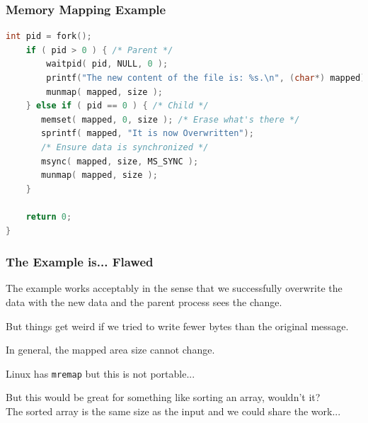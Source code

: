\begin{frame}[fragile]
\frametitle{Memory Mapping Example}

\begin{lstlisting}[language=C]
    int pid = fork();
    if ( pid > 0 ) { /* Parent */
        waitpid( pid, NULL, 0 );
        printf("The new content of the file is: %s.\n", (char*) mapped);
        munmap( mapped, size );
    } else if ( pid == 0 ) { /* Child */
       memset( mapped, 0, size ); /* Erase what's there */
       sprintf( mapped, "It is now Overwritten");
       /* Ensure data is synchronized */
       msync( mapped, size, MS_SYNC );
       munmap( mapped, size );
    }

    return 0;
}
\end{lstlisting}

\end{frame}

\begin{frame}
\frametitle{The Example is... Flawed}

The example works acceptably in the sense that we successfully overwrite the data with the new data and the parent process sees the change.

But things get weird if we tried to write fewer bytes than the original message. 

In general, the mapped area size cannot change.

Linux has \texttt{mremap} but this is not portable...

But this would be great for something like sorting an array, wouldn't it?\\
\quad The sorted array is the same size as the input and we could share the work...

\end{frame}







